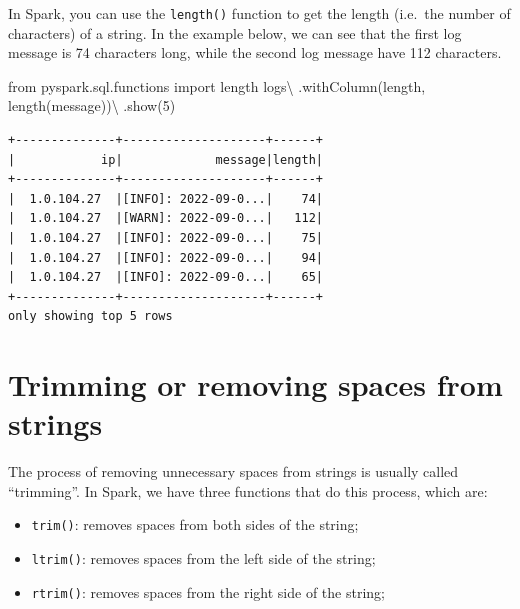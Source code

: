 \documentclass[
  11pt,
  letterpaper,
  DIV=11,
  numbers=noendperiod]{scrreprt}
\newenvironment{Shaded}{\begin{snugshade}}{\end{snugshade}}
\newcommand{\DecValTok}[1]{\textcolor[rgb]{0.68,0.00,0.00}{#1}}
\newcommand{\ImportTok}[1]{\textcolor[rgb]{0.00,0.46,0.62}{#1}}
\newcommand{\NormalTok}[1]{\textcolor[rgb]{0.00,0.23,0.31}{#1}}
\newcommand{\OperatorTok}[1]{\textcolor[rgb]{0.37,0.37,0.37}{#1}}
\newcommand{\StringTok}[1]{\textcolor[rgb]{0.13,0.47,0.30}{#1}}
\providecommand{\tightlist}{%
  \setlength{\itemsep}{0pt}\setlength{\parskip}{0pt}}\usepackage{longtable,booktabs,array}
\begin{document}
In Spark, you can use the \texttt{length()} function to get the length
(i.e.~the number of characters) of a string. In the example below, we
can see that the first log message is 74 characters long, while the
second log message have 112 characters.

\begin{Shaded}
\begin{Highlighting}[]
\ImportTok{from}\NormalTok{ pyspark.sql.functions }\ImportTok{import}\NormalTok{ length}
\NormalTok{logs}\OperatorTok{\textbackslash{}}
\NormalTok{    .withColumn(}\StringTok{\textquotesingle{}length\textquotesingle{}}\NormalTok{, length(}\StringTok{\textquotesingle{}message\textquotesingle{}}\NormalTok{))}\OperatorTok{\textbackslash{}}
\NormalTok{    .show(}\DecValTok{5}\NormalTok{)}
\end{Highlighting}
\end{Shaded}

\begin{verbatim}
+--------------+--------------------+------+
|            ip|             message|length|
+--------------+--------------------+------+
|  1.0.104.27  |[INFO]: 2022-09-0...|    74|
|  1.0.104.27  |[WARN]: 2022-09-0...|   112|
|  1.0.104.27  |[INFO]: 2022-09-0...|    75|
|  1.0.104.27  |[INFO]: 2022-09-0...|    94|
|  1.0.104.27  |[INFO]: 2022-09-0...|    65|
+--------------+--------------------+------+
only showing top 5 rows
\end{verbatim}

\hypertarget{trimming-or-removing-spaces-from-strings}{%
\section{Trimming or removing spaces from
strings}\label{trimming-or-removing-spaces-from-strings}}

The process of removing unnecessary spaces from strings is usually
called ``trimming''. In Spark, we have three functions that do this
process, which are:

\begin{itemize}
\tightlist
\item
  \texttt{trim()}: removes spaces from both sides of the string;
\item
  \texttt{ltrim()}: removes spaces from the left side of the string;
\item
  \texttt{rtrim()}: removes spaces from the right side of the string;
\end{itemize}
\end{document}
